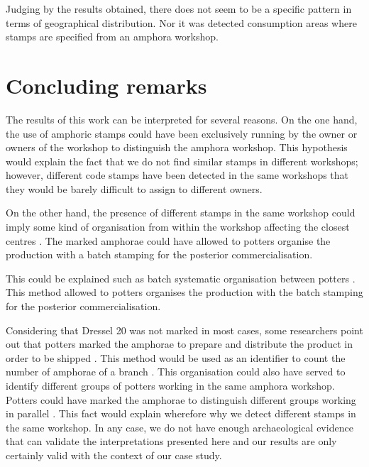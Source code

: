 \documentclass[review]{elsarticle}
\begin{document}

Judging by the results obtained, there does not seem to be a specific pattern in terms of geographical distribution. Nor it was detected consumption areas where stamps are specified from an amphora workshop. 


\section{Concluding remarks}


The results of this work can be interpreted for several reasons. On the one hand, the use of amphoric stamps could have been exclusively running by the owner or owners of the workshop to distinguish the amphora workshop. This hypothesis would explain the fact that we do not find similar stamps in different workshops; however, different code stamps have been detected in the same workshops that they would be barely difficult to assign to different owners.

On the other hand, the presence of different stamps in the same workshop could imply some kind of organisation from within the workshop affecting the closest centres \citep{juanmorostesis}. The marked amphorae could have allowed to potters organise the production with a batch stamping for the posterior commercialisation.  

This could be explained such as batch systematic organisation between potters \citep{juanmorostesis}. 
This method allowed to potters organises the production with the batch stamping for the posterior commercialisation.

Considering that Dressel 20 was not marked in most cases, some researchers point out that potters marked the amphorae to prepare and distribute the product in order to be shipped \citep{berni_millet_epigrafianforica_2008}. This method would be used as an identifier to count the number of amphorae of a branch \citep{juanmorostesis}. This organisation could also have served to identify different groups of potters working in the same amphora workshop. Potters could have marked the amphorae to distinguish different groups working in parallel \citep{li_crossbows_2014}. This fact would explain wherefore why we detect different stamps in the same workshop. In any case, we do not have enough archaeological evidence that can validate the interpretations presented here and our results are only certainly valid with the context of our case study. 
\end{document}
